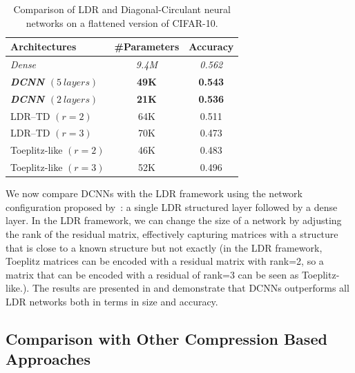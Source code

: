 \begin{table}[htb]
  \centering
  \begin{tabular}{lcc}
    \toprule
    \textbf{Architectures} & \textbf{\#Parameters} & \textbf{Accuracy}  \\
    \midrule
    \textit{Dense} & \textit{9.4M}	 & \textit{0.562} \\
    \textbf{\textit{DCNN $(5\ layers)$}} & \textbf{49K}	& \textbf{0.543} \\
    \textbf{\textit{DCNN $(2\ layers)$}} & \textbf{21K} & \textbf{0.536} \\
    LDR--TD	$(r = 2)$	         & 64K	& 0.511 \\
    LDR--TD	$(r = 3)$	         & 70K	& 0.473 \\
    Toeplitz-like $(r=2)$	         & 46K	& 0.483 \\
    Toeplitz-like $(r =3)$	         & 52K  & 0.496 \\
    \bottomrule
    \end{tabular}
    \caption{Comparison of LDR and Diagonal-Circulant neural networks on a flattened version of CIFAR-10.} 
    \label{table:ch4-xp_ldr}
\end{table}

We now compare DCNNs with the LDR framework using the network configuration proposed by~\citet{thomas2018learning}: a single LDR structured layer followed by a dense layer.
In the LDR framework, we can change the size of a network by adjusting the rank of the residual matrix, effectively capturing matrices with a structure that is close to a known structure but not exactly (in the LDR framework, Toeplitz matrices can be encoded with a residual matrix with rank=2, so a matrix that can be encoded with a residual of rank=3 can be seen as Toeplitz-like.).
The results are presented in  and demonstrate that DCNNs outperforms all LDR networks both in terms in size and accuracy.


\subsection{Comparison with Other Compression Based Approaches}
\label{subsection:ch4-comparison_with_other_compression_based_approaches}


